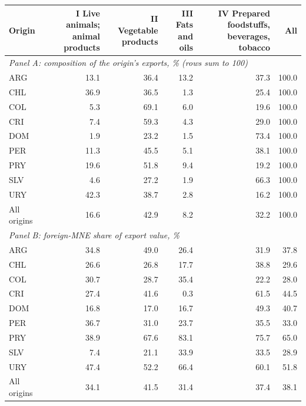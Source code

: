 \begin{tabular}{lrrrrr}
\toprule
Origin & I Live animals; animal products & II Vegetable products & III Fats and oils & IV Prepared foodstuffs, beverages, tobacco & All \\
\midrule
\multicolumn{6}{l}{\textit{Panel A: composition of the origin's exports, \% (rows sum to 100)}} \\
ARG & 13.1 & 36.4 & 13.2 & 37.3 & 100.0 \\
CHL & 36.9 & 36.5 & 1.3 & 25.4 & 100.0 \\
COL & 5.3 & 69.1 & 6.0 & 19.6 & 100.0 \\
CRI & 7.4 & 59.3 & 4.3 & 29.0 & 100.0 \\
DOM & 1.9 & 23.2 & 1.5 & 73.4 & 100.0 \\
PER & 11.3 & 45.5 & 5.1 & 38.1 & 100.0 \\
PRY & 19.6 & 51.8 & 9.4 & 19.2 & 100.0 \\
SLV & 4.6 & 27.2 & 1.9 & 66.3 & 100.0 \\
URY & 42.3 & 38.7 & 2.8 & 16.2 & 100.0 \\
All origins & 16.6 & 42.9 & 8.2 & 32.2 & 100.0 \\
\midrule
\multicolumn{6}{l}{\textit{Panel B: foreign-MNE share of export value, \%}} \\
ARG & 34.8 & 49.0 & 26.4 & 31.9 & 37.8 \\
CHL & 26.6 & 26.8 & 17.7 & 38.8 & 29.6 \\
COL & 30.7 & 28.7 & 35.4 & 22.2 & 28.0 \\
CRI & 27.4 & 41.6 & 0.3 & 61.5 & 44.5 \\
DOM & 16.8 & 17.0 & 16.7 & 49.3 & 40.7 \\
PER & 36.7 & 31.0 & 23.7 & 35.5 & 33.0 \\
PRY & 38.9 & 67.6 & 83.1 & 75.7 & 65.0 \\
SLV & 7.4 & 21.1 & 33.9 & 33.5 & 28.9 \\
URY & 47.4 & 52.2 & 66.4 & 60.1 & 51.8 \\
All origins & 34.1 & 41.5 & 31.4 & 37.4 & 38.1 \\
\bottomrule
\end{tabular}
